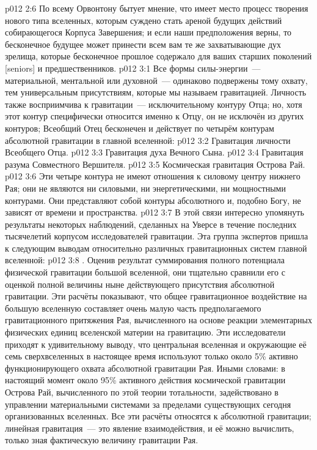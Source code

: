 \vs p012 2:6 По всему Орвонтону бытует мнение, что имеет место процесс творения нового типа вселенных, которым суждено стать ареной будущих действий собирающегося Корпуса Завершения; и если наши предположения верны, то бесконечное будущее может принести всем вам те же захватывающие дух зрелища, которые бесконечное прошлое содержало для ваших старших поколений [seniors] и предшественников.
\vs p012 3:1 Все формы силы\hyp{}энергии~--- материальной, ментальной или духовной~--- одинаково подвержены тому охвату, тем универсальным присутствиям, которые мы называем гравитацией. Личность также восприимчива к гравитации~--- исключительному контуру Отца; но, хотя этот контур специфически относится именно к Отцу, он не исключён из других контуров; Всеобщий Отец бесконечен и действует по  четырём контурам абсолютной гравитации в главной вселенной:
\vs p012 3:2 Гравитация личности Всеобщего Отца.
\vs p012 3:3 Гравитация духа Вечного Сына.
\vs p012 3:4 Гравитация разума Совместного Вершителя.
\vs p012 3:5 Космическая гравитация Острова Рай.
\vs p012 3:6 \pc Эти четыре контура не имеют отношения к силовому центру нижнего Рая; они не являются ни силовыми, ни энергетическими, ни мощностными контурами. Они представляют собой контуры абсолютного  и, подобно Богу, не зависят от времени и пространства.
\vs p012 3:7 В этой связи интересно упомянуть результаты некоторых наблюдений, сделанных на Уверсе в течение последних тысячелетий корпусом исследователей гравитации. Эта группа экспертов пришла к следующим выводам относительно различных гравитационных систем главной вселенной:
\vs p012 3:8 . Оценив результат суммирования полного потенциала физической гравитации большой вселенной, они тщательно сравнили его с оценкой полной величины ныне действующего присутствия абсолютной гравитации. Эти расчёты показывают, что общее гравитационное воздействие на большую вселенную составляет очень малую часть предполагаемого гравитационного притяжения Рая, вычисленного на основе реакции элементарных физических единиц вселенской материи на гравитацию. Эти исследователи приходят к удивительному выводу, что центральная вселенная и окружающие её семь сверхвселенных в настоящее время используют только около 5\% активно функционирующего охвата абсолютной гравитации Рая. Иными словами: в настоящий момент около 95\% активного действия космической гравитации Острова Рай, вычисленного по этой теории тотальности, задействовано в управлении материальными системами за пределами существующих сегодня организованных вселенных. Все эти расчёты относятся к абсолютной гравитации; линейная гравитация~--- это явление взаимодействия, и её можно вычислить, только зная фактическую величину гравитации Рая.
